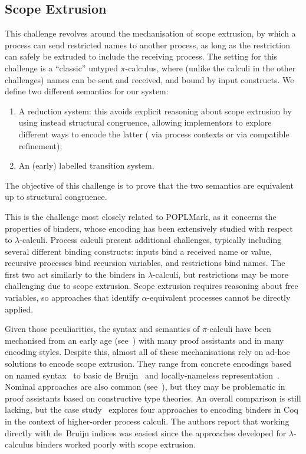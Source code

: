 \documentclass[runningheads]{llncs}
\begin{document}
\subsection{Scope Extrusion}
This challenge revolves around the mechanisation of scope
extrusion, by which a process can send restricted names to another
process, as long as the restriction can safely be extruded to include
the receiving process.  The setting for this challenge is a
``classic'' untyped \( \pi \)-calculus, where (unlike the calculi in
the other challenges) names can be sent and received, and bound by
input constructs.  We define two different semantics for our system:
\begin{enumerate}
\item A reduction system: this avoids explicit reasoning about scope
  extrusion by using instead structural congruence, allowing
  implementors to explore different ways to encode the latter (\eg
  via process contexts or via compatible refinement);
\item An (early) labelled transition system.
\end{enumerate}
The objective of this
challenge is to prove that the two semantics are equivalent up to
structural congruence.

This is the challenge most closely related to POPLMark,
as it concerns the properties of binders, whose encoding has been
extensively studied with respect to $\lambda$-calculi. Process calculi
present additional challenges, typically including several
different binding constructs: inputs bind a received name or value,
recursive processes bind recursion variables, and restrictions bind
names. The first two act similarly to the binders in
$\lambda$-calculi, but restrictions may be more challenging due to
scope extrusion.
Scope extrusion requires reasoning about free variables, so approaches that identify \(\alpha\)-equivalent processes cannot be directly applied.

Given those peculiarities, the syntax and semantics of $\pi$-calculi
have been mechanised from an early age (see~\cite{Melham1994}) with
many proof assistants and in many encoding styles.  Despite this,
almost all of these mechanisations rely on ad-hoc solutions to encode
scope extrusion.  They range from concrete encodings based on named
syntax~\cite{Melham1994} to basic de Bruijn~\cite{Hirschkoff1997,
  Perera2018} and locally-nameless representation~\cite{Castro2020}.
Nominal approaches are also common (see~\cite{Bengtson2009}), but they
may be problematic in proof assistants based on constructive type
theories.  An overall comparison is still lacking, but the case
study~\cite{AmbalLS21} explores four approaches to encoding binders in
Coq in the context of higher-order process calculi.  The authors report that working directly
with de~Bruijn indices was easiest since the approaches
developed for $\lambda$-calculus binders worked poorly with scope
extrusion.
\end{document}
